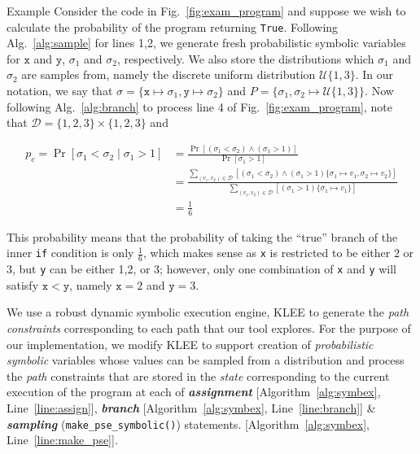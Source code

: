 \begin{paragraph}{Example}
	Consider the code in Fig.~\ref{fig:exam_program} and suppose we wish to calculate the probability of the program returning \texttt{True}.
	Following Alg.~\ref{alg:sample} for lines 1,2, we generate fresh probabilistic symbolic variables for $\mathtt{x}$ and $\mathtt{y}$, $\sigma_1$ and $\sigma_2$, respectively.
	We also store the distributions which $\sigma_1$ and $\sigma_2$ are samples from, namely the discrete uniform distribution $\mathcal{U}\{1,3\}$.
	In our notation, we say that $\sigma = \{ \mathtt{x} \mapsto \sigma_1, \mathtt{y} \mapsto \sigma_2 \}$ and $P = \{ \sigma_1,\sigma_2 \mapsto \mathcal{U}\{1,3\} \}$.
	Now following Alg.~\ref{alg:branch} to process line 4 of Fig.~\ref{fig:exam_program}, note that $\mathcal{D} = \{1,2,3\} \times \{1,2,3\}$ and 
	
	\begin{align*}
		p_c = \Pr[\sigma_1 < \sigma_2 \mid \sigma_1 > 1] &= \frac{\Pr[(\sigma_1 < \sigma_2) \wedge (\sigma_1 > 1)]}{\Pr[\sigma_1 > 1]}\\
		&= \frac{\displaystyle\sum_{(v_1,v_2) \in \mathcal{D}} [(\sigma_1 < \sigma_2) \wedge (\sigma_1 > 1)\{\sigma_1 \mapsto v_1, \sigma_2 \mapsto v_2\}]}{\displaystyle\sum_{(v_1,v_2) \in \mathcal{D}} [(\sigma_1 > 1)\{\sigma_1 \mapsto v_1\}]}\\
		&= \frac{1}{6}
	\end{align*}
	
	This probability means that the probability of taking the ``true'' branch of the inner \texttt{if} condition is only $\frac{1}{6}$, which makes sense as \texttt{x} is restricted to be either $2$ or $3$, but \texttt{y} can be either 1,2, or 3; however, only one combination of \texttt{x} and \texttt{y} will satisfy $\mathtt{x} < \mathtt{y}$, namely $\mathtt{x} = 2$ and $\mathtt{y} = 3$.
\end{paragraph}

We use a robust dynamic symbolic execution engine, \textsc{KLEE} to generate the \textit{path constraints} corresponding to each path that our tool explores. For the purpose of our implementation, we modify \textsc{KLEE} to support creation of \textit{probabilistic symbolic} variables whose values can be sampled from a distribution and process the \textit{path} constraints that are stored in the \textit{state} corresponding to the current execution of the program at each of \textbf{\textit{assignment}} [Algorithm~\ref{alg:symbex}, Line~\ref{line:assign}], \textbf{\textit{branch}} [Algorithm~\ref{alg:symbex}, Line~\ref{line:branch}] \& \textbf{\textit{sampling}} (\texttt{make\_pse\_symbolic()}) statements. [Algorithm~\ref{alg:symbex}, Line~\ref{line:make_pse}].